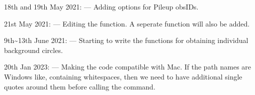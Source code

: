 \documentclass[letterpaper,10pt,english]{sphinxmanual}
\begin{document}
\sphinxAtStartPar
18th and 19th May 2021:
—
Adding options for Pile\sphinxhyphen{}up obsIDs.

\sphinxAtStartPar
21st May 2021:
—
Editing the  function.
A seperate function  will also be added.

\sphinxAtStartPar
9th\textasciitilde{}13th June 2021:
—
Starting to write the functions for obtaining individual background circles.

\sphinxAtStartPar
20th Jan 2023:
—
Making the code compatible with Mac.
If the path names are Windows like, containing white\sphinxhyphen{}spaces, then we need to have
additional single quotes around them before calling the  command.
\end{document}
